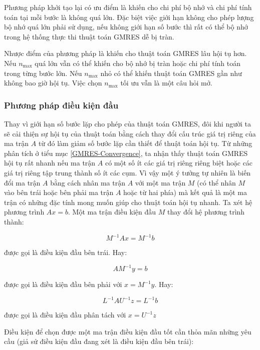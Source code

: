 \documentclass[14pt, a4paper]{article}
\numberwithin{equation}{section}
\numberwithin{algorithm}{section}
\numberwithin{figure}{section}
\numberwithin{dl}{section}
\numberwithin{md}{section}
\numberwithin{bd}{section}
\numberwithin{dn}{section}
\begin{document}
Phương pháp khởi tạo lại có ưu điểm là khiến cho chi phí bộ nhớ và chi phí tính toán tại mỗi bước là không quá lớn. Đặc biệt việc giới hạn không cho phép lượng bộ nhớ quá lớn phải sử dụng, nếu không giới hạn số bước thì rất có thể bộ nhớ trong hệ thống thực thi thuật toán GMRES dễ bị tràn.

Nhược điểm của phương pháp là khiến cho thuật toán GMRES lâu hội tụ hơn. Nếu $n_{\max}$ quá lớn vẫn có thể khiến cho bộ nhớ bị tràn hoặc chi phí tính toán trong từng bước lớn. Nếu $n_{\max}$ nhỏ có thể khiến thuật toán GMRES gần như không bao giờ hội tụ. Việc chọn $n_{\max}$ tối ưu vẫn là một câu hỏi mở.

\subsubsection{Phương pháp điều kiện đầu}

Thay vì giới hạn số bước lặp cho phép của thuật toán GMRES, đôi khi người ta sẽ cải thiện sự hội tụ của thuật toán bằng cách thay đổi cấu trúc giá trị riêng của ma trận $A$ từ đó làm giảm số bước lặp cần thiết để thuật toán hội tụ.
Từ những phân tích ở tiểu mục \ref{GMRES-Convergence}, ta nhận thấy thuật toán GMRES hội tụ rất nhanh nếu ma trận $A$ có một số ít các giá trị riêng riêng biệt hoặc các giá trị riêng tập trung thành số ít các cụm. Vì vậy một ý tưởng tự nhiên là biến đổi ma trận $A$ bằng cách nhân ma trận $A$ với một ma trận $M$ (có thể nhân $M$ vào bên trái hoặc bên phải ma trận $A$ hoặc từ hai phía) mà kết quả là một ma trận có những đặc tính mong muốn giúp cho thuật toán hội tụ nhanh.
Ta xét hệ phương trình $Ax=b$. Một ma trận điều kiện đầu $M$ thay đổi hệ phương trình thành:

\begin{equation}
    M^{-1}Ax = M^{-1}b
\end{equation}

được gọi là điều kiện đầu bên trái. Hay:

\begin{equation}
    AM^{-1}y = b
\end{equation}

được gọi là điều kiện đầu bên phải với $x=M^{-1}y$. Hay:

\begin{equation}
    L^{-1}AU^{-1}z = L^{-1}b
\end{equation}

được gọi là điều kiện đầu phân tách với $x=U^{-1}z$

Điều kiện để chọn được một ma trận điều kiện đầu tốt cần thỏa mãn những yêu cầu (giả sử điều kiện đầu đang xét là điều kiện đầu bên trái):
\end{document}
